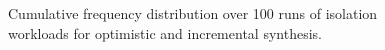 %
%

\begin{figure}
	\centering
	\caption{\label{fig:cdf}
		Cumulative frequency distribution over 100 runs of isolation workloads for optimistic and incremental synthesis.}
\end{figure}




